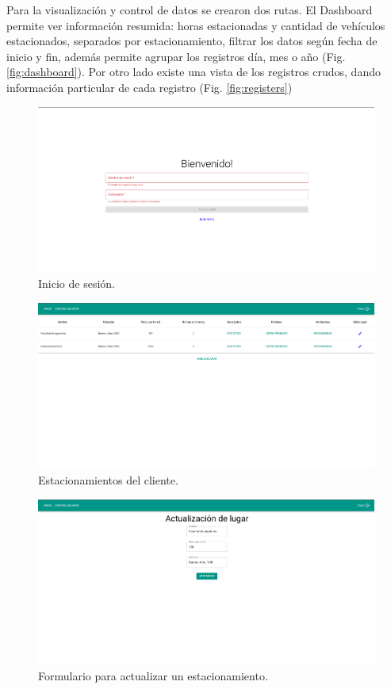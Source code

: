 Para la visualización y control de datos se crearon dos rutas.
El Dashboard permite ver información resumida: horas estacionadas y cantidad de vehículos estacionados, separados por estacionamiento, filtrar los datos según fecha de inicio y fin, además permite agrupar los registros día, mes o año (Fig. \ref{fig:dashboard}).
Por otro lado existe una vista de los registros crudos, dando información particular de cada registro (Fig. \ref{fig:registers})


\begin{figure}[bth]
    \centering
    \includegraphics[width=\textwidth]{imgs/server/login.png}
    \caption{Inicio de sesión.}
    \label{fig:login}
\end{figure}

\begin{figure}[bth]
    \centering
    \includegraphics[width=\textwidth]{imgs/server/places.png}
    \caption{Estacionamientos del cliente.}
    \label{fig:home}
\end{figure}

\begin{figure}[bth]
    \centering
    \includegraphics[width=\textwidth]{imgs/server/update-place.png}
    \caption{Formulario para actualizar un estacionamiento.}
    \label{fig:update-place}
\end{figure}



